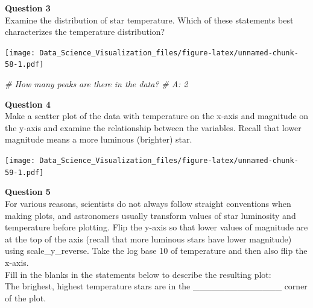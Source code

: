 \documentclass[
]{article}
\newenvironment{Shaded}{\begin{snugshade}}{\end{snugshade}}
\newcommand{\CommentTok}[1]{\textcolor[rgb]{0.56,0.35,0.01}{\textit{#1}}}
\newcommand{\DataTypeTok}[1]{\textcolor[rgb]{0.13,0.29,0.53}{#1}}
\newcommand{\KeywordTok}[1]{\textcolor[rgb]{0.13,0.29,0.53}{\textbf{#1}}}
\newcommand{\NormalTok}[1]{#1}
\newcommand{\OperatorTok}[1]{\textcolor[rgb]{0.81,0.36,0.00}{\textbf{#1}}}
\newcommand{\StringTok}[1]{\textcolor[rgb]{0.31,0.60,0.02}{#1}}
\begin{document}
\textbf{Question 3}\\
Examine the distribution of star temperature. Which of these statements
best characterizes the temperature distribution?

\begin{Shaded}
\end{Shaded}

\texttt{[image: Data\_Science\_Visualization\_files/figure-latex/unnamed-chunk-58-1.pdf]}

\begin{Shaded}
\begin{Highlighting}[]
\CommentTok{# How many peaks are there in the data?}
\CommentTok{# A: 2}
\end{Highlighting}
\end{Shaded}

\textbf{Question 4}\\
Make a scatter plot of the data with temperature on the x-axis and
magnitude on the y-axis and examine the relationship between the
variables. Recall that lower magnitude means a more luminous (brighter)
star.

\begin{Shaded}
\end{Shaded}

\texttt{[image: Data\_Science\_Visualization\_files/figure-latex/unnamed-chunk-59-1.pdf]}

\textbf{Question 5}\\
For various reasons, scientists do not always follow straight
conventions when making plots, and astronomers usually transform values
of star luminosity and temperature before plotting. Flip the y-axis so
that lower values of magnitude are at the top of the axis (recall that
more luminous stars have lower magnitude) using scale\_y\_reverse. Take
the log base 10 of temperature and then also flip the x-axis.\\
Fill in the blanks in the statements below to describe the resulting
plot:\\
The brighest, highest temperature stars are in the
\_\_\_\_\_\_\_\_\_\_\_\_\_\_ corner of the plot.
\end{document}
